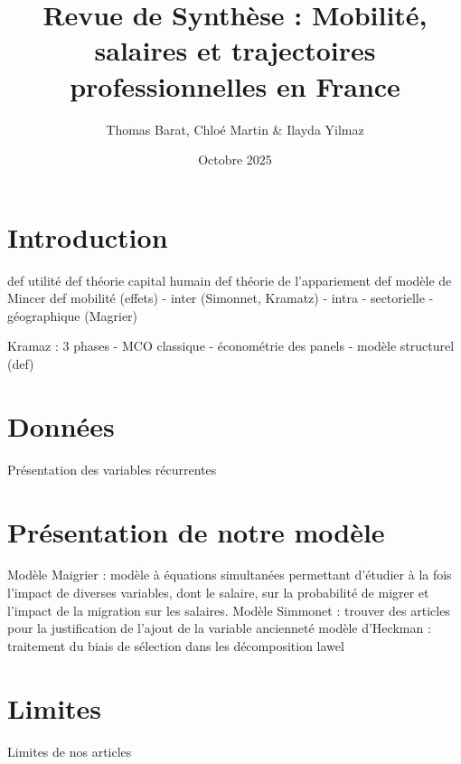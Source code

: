 \documentclass[12pt,a4paper]{article}
\title{Revue de Synthèse : Mobilité, salaires et trajectoires professionnelles en France}
\author{Thomas Barat, Chloé Martin \& Ilayda Yilmaz}
\date{Octobre 2025}
\begin{document}
\maketitle

\section*{Introduction}

def utilité 
def théorie capital humain
def théorie de l'appariement
def modèle de Mincer
def mobilité (effets)
    - inter (Simonnet, Kramatz)
    - intra
    - sectorielle
    - géographique (Magrier)

Kramaz : 3 phases 
- MCO classique
- économétrie des panels
- modèle structurel (def)

\section*{Données}

Présentation des variables récurrentes


\section*{Présentation de notre modèle}

Modèle Maigrier : modèle à équations simultanées permettant d’étudier à la fois l’impact de diverses variables, dont le salaire, sur la probabilité de migrer et l’impact de la migration sur les salaires.
Modèle Simmonet : trouver des articles pour la justification de l'ajout de la variable ancienneté
modèle d'Heckman : traitement du biais de sélection dans les 
décomposition
lawel

\section*{Limites}

Limites de nos articles
\end{document}

